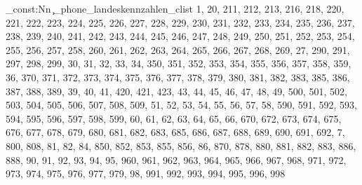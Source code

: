 \clist_const:Nn \c_phone_landeskennzahlen_clist {1,
20,
211,
212,
213,
216,
218,
220,
221,
222,
223,
224,
225,
226,
227,
228,
229,
230,
231,
232,
233,
234,
235,
236,
237,
238,
239,
240,
241,
242,
243,
244,
245,
246,
247,
248,
249,
250,
251,
252,
253,
254,
255,
256,
257,
258,
260,
261,
262,
263,
264,
265,
266,
267,
268,
269,
27,
290,
291,
297,
298,
299,
30,
31,
32,
33,
34,
350,
351,
352,
353,
354,
355,
356,
357,
358,
359,
36,
370,
371,
372,
373,
374,
375,
376,
377,
378,
379,
380,
381,
382,
383,
385,
386,
387,
388,
389,
39,
40,
41,
420,
421,
423,
43,
44,
45,
46,
47,
48,
49,
500,
501,
502,
503,
504,
505,
506,
507,
508,
509,
51,
52,
53,
54,
55,
56,
57,
58,
590,
591,
592,
593,
594,
595,
596,
597,
598,
599,
60,
61,
62,
63,
64,
65,
66,
670,
672,
673,
674,
675,
676,
677,
678,
679,
680,
681,
682,
683,
685,
686,
687,
688,
689,
690,
691,
692,
7,
800,
808,
81,
82,
84,
850,
852,
853,
855,
856,
86,
870,
878,
880,
881,
882,
883,
886,
888,
90,
91,
92,
93,
94,
95,
960,
961,
962,
963,
964,
965,
966,
967,
968,
971,
972,
973,
974,
975,
976,
977,
979,
98,
991,
992,
993,
994,
995,
996,
998}
